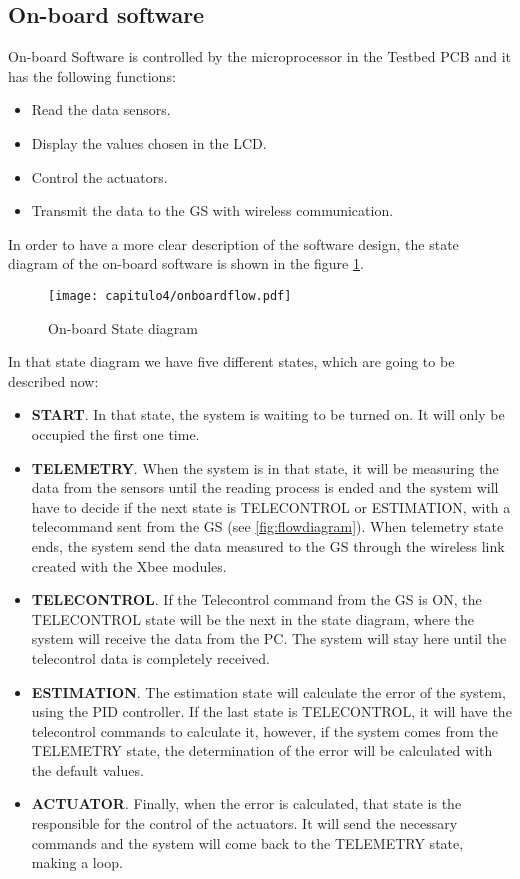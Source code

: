 \subsection{On-board software} \label{ssec:onboard} 
On-board Software is controlled by the microprocessor in the Testbed \acrshort{PCB} and it has the following functions:
\begin{itemize}
\item Read the data sensors.
\item Display the values chosen in the \acrshort{LCD}.
\item Control the actuators.
\item Transmit the data to the \acrshort{GS} with wireless communication.
\end{itemize}

In order to have a more clear description of the software design, the state diagram of the on-board software is shown in the figure \ref{fig:onboardflow}.
\begin{figure}[H]
	\centering
		\texttt{[image: capitulo4/onboardflow.pdf]}
	\caption{On-board State diagram}
	\label{fig:onboardflow}
\end{figure}

In that state diagram we have five different states, which are going to be described now:
\begin{itemize}
\item \textbf{START}. In that state, the system is waiting to be turned on. It will only be occupied the first one time.
\item \textbf{TELEMETRY}. When the system is in that state, it will be measuring the data from the sensors until the reading process is ended and the system will have to decide if the next state is TELECONTROL or ESTIMATION, with a telecommand sent from the \acrshort{GS} (see \ref{fig:flowdiagram}). When telemetry state ends, the system send the data measured to the \acrshort{GS} through the wireless link created with the Xbee modules.
\item \textbf{TELECONTROL}. If the Telecontrol command from the \acrshort{GS} is ON, the TELECONTROL state will be the next in the state diagram, where the system will receive the data from the \acrshort{PC}. The system will stay here until the telecontrol data is completely received.
\item \textbf{ESTIMATION}. The estimation state will calculate the error of the system, using the \acrshort{PID} controller. If the last state is TELECONTROL, it will have the telecontrol commands to calculate it, however, if the system comes from the TELEMETRY state, the determination of the error will be calculated with the default values.
\item \textbf{ACTUATOR}. Finally, when the error is calculated, that state is the responsible for the control of the actuators. It will send the necessary commands and the system will come back to the TELEMETRY state, making a loop.
\end{itemize}



